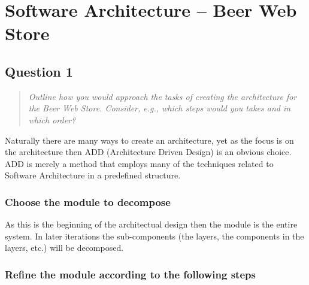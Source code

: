 \section{Software Architecture -- Beer Web Store}


\subsection{Question 1}
\begin{quote}
\emph{Outline how you would approach the tasks of creating the
architecture for the Beer Web Store. Consider, e.g., which steps
would you takes and in which order?}
\end{quote}

Naturally there are many ways to create an architecture, yet as the focus is on the architecture then ADD (Architecture Driven Design) is an obvious choice. ADD is merely a method that employs many of the techniques related to Software Architecture in a predefined structure.

\subsubsection{Choose the module to decompose}
As this is the beginning of the architectual design then the module is the entire system. In later iterations the sub-components (the layers, the components in the layers, etc.) will be decomposed.

\subsubsection{Refine the module according to the following steps}

